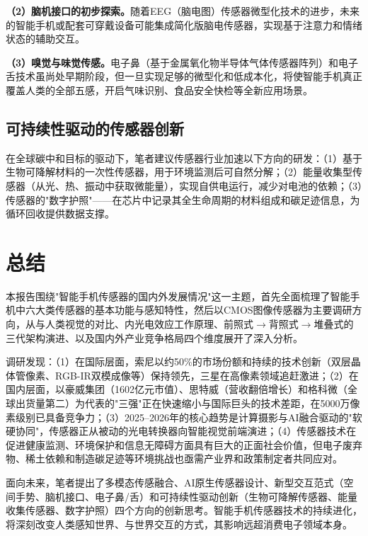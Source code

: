 \documentclass[12pt, a4paper]{ctexart}
\begin{document}
\textbf{（2）脑机接口的初步探索。}随着EEG（脑电图）传感器微型化技术的进步，未来的智能手机或配套可穿戴设备可能集成简化版脑电传感器，实现基于注意力和情绪状态的辅助交互。

\textbf{（3）嗅觉与味觉传感。}电子鼻（基于金属氧化物半导体气体传感器阵列）和电子舌技术虽尚处早期阶段，但一旦实现足够的微型化和低成本化，将使智能手机真正覆盖人类的全部五感，开启气味识别、食品安全快检等全新应用场景。

\subsection{可持续性驱动的传感器创新}

在全球碳中和目标的驱动下，笔者建议传感器行业加速以下方向的研发：（1）基于生物可降解材料的一次性传感器，用于环境监测后可自然分解；（2）能量收集型传感器（从光、热、振动中获取微能量），实现自供电运行，减少对电池的依赖；（3）传感器的"数字护照"——在芯片中记录其全生命周期的材料组成和碳足迹信息，为循环回收提供数据支撑。


\section{总结}

本报告围绕"智能手机传感器的国内外发展情况"这一主题，首先全面梳理了智能手机中六大类传感器的基本功能与感知特性，然后以CMOS图像传感器为主要调研方向，从与人类视觉的对比、内光电效应工作原理、前照式$\to$背照式$\to$堆叠式的三代架构演进、以及国内外产业竞争格局四个维度展开了深入分析。

调研发现：（1）在国际层面，索尼以约50\%的市场份额和持续的技术创新（双层晶体管像素、RGB-IR双模成像等）保持领先，三星在高像素领域追赶激进；（2）在国内层面，以豪威集团（1602亿元市值）、思特威（营收翻倍增长）和格科微（全球出货量第二）为代表的"三强"正在快速缩小与国际巨头的技术差距，在5000万像素级别已具备竞争力；（3）2025--2026年的核心趋势是计算摄影与AI融合驱动的"软硬协同"，传感器正从被动的光电转换器向智能视觉前端演进；（4）传感器技术在促进健康监测、环境保护和信息无障碍方面具有巨大的正面社会价值，但电子废弃物、稀土依赖和制造碳足迹等环境挑战也亟需产业界和政策制定者共同应对。

面向未来，笔者提出了多模态传感融合、AI原生传感器设计、新型交互范式（空间手势、脑机接口、电子鼻/舌）和可持续性驱动创新（生物可降解传感器、能量收集传感器、数字护照）四个方向的创新思考。智能手机传感器技术的持续进化，将深刻改变人类感知世界、与世界交互的方式，其影响远超消费电子领域本身。
\end{document}
